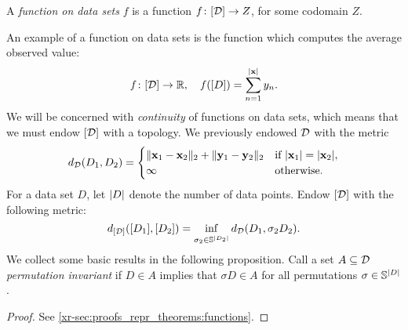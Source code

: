 \documentclass[12pt, twoside]{report}
\newcommand{\xrprefix}[1]{xr-#1}
\begin{document}
\begin{definition}
    A \emph{function on data sets} $f$ is a function $f\colon[\mathcal{D}] \to Z$, for some codomain $Z$.
\end{definition}

An example of a function on data sets is the function which computes the average observed value:
\begin{equation}
    f\colon [\mathcal{D}] \to \mathbb{R}, \quad
    f([D]) = \sum_{n=1}^{\lvert\mathbf{x}\rvert} y_n.
\end{equation}
We will be concerned with \emph{continuity} of functions on data sets, which means that we must endow $[\mathcal{D}]$ with a topology.
We previously endowed $\mathcal{D}$ with the metric
\begin{equation}
    d_{\mathcal{D}}(D_1, D_2) = \begin{cases}
        \lVert\mathbf{x}_1 - \mathbf{x}_2\rVert_2 + \lVert\mathbf{y}_1 - \mathbf{y}_2\rVert_2 & \text{if $\lvert\mathbf{x}_1\rvert = \lvert\mathbf{x}_2\rvert$}, \\
        \infty & \text{otherwise}.
    \end{cases}
\end{equation}
For a data set $D$, let $\lvert D\rvert$ denote the number of data points.
Endow $[\mathcal{D}]$ with the following metric:
\begin{equation} \label{eq:metric_data_sets_infimum}
    d_{[\D]}([D_1], [D_2]) = \inf_{\sigma_2 \in \Sb^{\abs{D_2}}} d_\D(D_1, \sigma_2 D_2).
\end{equation}
We collect some basic results in the following proposition.
Call a set $A \subseteq \mathcal{D}$ \emph{permutation invariant} if $D \in A$ implies that $\sigma D \in A$ for all permutations $\sigma \in \mathbb{S}^{\lvert D\rvert}$.

\begin{proof}
    See \cref{\xrprefix{sec:proofs_repr_theorems:functions}}.
\end{proof}
\end{document}
